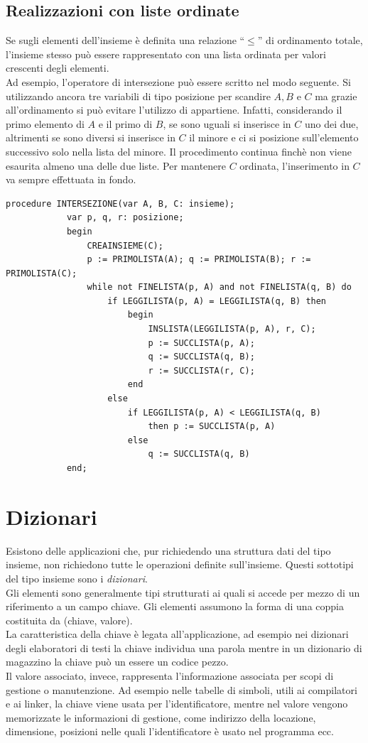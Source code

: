 \documentclass[12pt]{report}
\begin{document}
	\section{Realizzazioni con liste ordinate}
	Se sugli elementi dell'insieme è definita una relazione ``$\leq$'' di ordinamento totale, l'insieme stesso può essere rappresentato con una lista ordinata per valori crescenti degli elementi. \\
	Ad esempio, l'operatore di intersezione può essere scritto nel modo seguente. Si utilizzando ancora tre variabili di tipo posizione per scandire $A, B$ e $C$ ma grazie all'ordinamento si può evitare l'utilizzo di appartiene. Infatti, considerando il primo elemento di $A$ e il primo di $B$, se sono uguali si inserisce in $C$ uno dei due, altrimenti se sono diversi si inserisce in $C$ il minore e ci si posizione sull'elemento successivo solo nella lista del minore. Il procedimento continua finchè non viene esaurita almeno una delle due liste. Per mantenere $C$ ordinata, l'inserimento in $C$ va sempre effettuata in fondo.
	\begin{lstlisting}[style=pascalstyle]
		procedure INTERSEZIONE(var A, B, C: insieme);
			var p, q, r: posizione;
			begin
				CREAINSIEME(C);
				p := PRIMOLISTA(A); q := PRIMOLISTA(B); r := PRIMOLISTA(C);
				while not FINELISTA(p, A) and not FINELISTA(q, B) do
					if LEGGILISTA(p, A) = LEGGILISTA(q, B) then
						begin
							INSLISTA(LEGGILISTA(p, A), r, C);
							p := SUCCLISTA(p, A);
							q := SUCCLISTA(q, B);
							r := SUCCLISTA(r, C);
						end
					else
						if LEGGILISTA(p, A) < LEGGILISTA(q, B)
							then p := SUCCLISTA(p, A)
						else
							q := SUCCLISTA(q, B)
			end;
	\end{lstlisting}
	\chapter{Dizionari}
	Esistono delle applicazioni che, pur richiedendo una struttura dati del tipo insieme, non richiedono tutte le operazioni definite sull'insieme. Questi sottotipi del tipo insieme sono i \textit{dizionari}. \\
	Gli elementi sono generalmente tipi strutturati ai quali si accede per mezzo di un riferimento a un campo chiave. Gli elementi assumono la forma di una coppia costituita da (chiave, valore). \\
	La caratteristica della chiave è legata all'applicazione, ad esempio nei dizionari degli elaboratori di testi la chiave individua una parola mentre in un dizionario di magazzino la chiave può un essere un codice pezzo. \\
	Il valore associato, invece, rappresenta l'informazione associata per scopi di gestione o manutenzione. Ad esempio nelle tabelle di simboli, utili ai compilatori e ai linker, la chiave viene usata per l'identificatore, mentre nel valore vengono memorizzate le informazioni di gestione, come indirizzo della locazione, dimensione, posizioni nelle quali l'identificatore è usato nel programma ecc.
\end{document}
